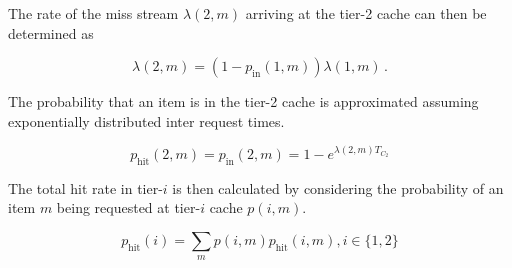 The rate of the miss stream $\lambda(2,m)$ arriving at the tier-2 cache can then be determined as

\begin{equation}
\lambda(2,m) = (1-p_\text{in}(1,m))\lambda(1,m) \, .
\end{equation}

The probability that an item is in the tier-2 cache is approximated assuming exponentially distributed inter request times.

\begin{equation}
p_\text{hit}(2,m) = p_\text{in}(2,m) = 1-e^{\lambda(2,m)T_{C_2}}
\end{equation}

The total hit rate in tier-$i$ is then calculated by considering the probability of an item $m$ being requested at tier-$i$ cache $p(i,m)$.

\begin{equation}
p_\text{hit}(i) = \sum_{m}p(i,m)p_\text{hit}(i,m), i\in\{1,2\}
\end{equation}







